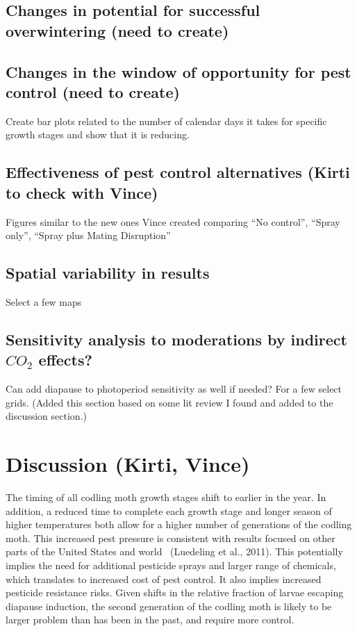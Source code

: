 \documentclass[12pt]{article}
\theoremstyle{plain}
\theoremstyle{definition}
\theoremstyle{definition}
\begin{document}
\subsection{Changes in potential for successful overwintering  (need to create)}

\subsection{Changes in the window of opportunity for pest control  (need to create)}
Create bar plots related to the  number of calendar days it takes for specific growth stages and show that it is reducing.


\subsection{Effectiveness of pest control alternatives  (Kirti to check with Vince)}
Figures similar to the new ones Vince created comparing “No control”, “Spray only”, “Spray plus Mating Disruption”


\subsection{Spatial variability in results}
Select a few maps


\subsection{Sensitivity analysis to moderations by indirect $CO_2$ effects?}
Can add diapause to photoperiod sensitivity as well if needed?
For a few select grids. (Added this section based on some lit review I found and added to the discussion section.)

\section{Discussion (Kirti, Vince)}

The timing of all codling moth growth stages shift to 
earlier in the year. In addition, a reduced time to complete 
each growth stage and longer season of higher temperatures 
both allow for a higher number of generations of the 
codling moth. This increased pest pressure is consistent 
with results focused on other parts of the United States 
and world~\cite{Juszczak2013, Rafoss_Trond, Stoeckli_2012} (Luedeling et al., 2011). 
This potentially implies the need for additional 
pesticide sprays and larger range of chemicals, 
which translates to increased cost of pest control. 
It also implies increased pesticide resistance risks. 
Given shifts in the relative fraction of larvae escaping 
diapause induction, the second generation of the codling 
moth is likely to be larger problem than has been in 
the past, and require more control.
\end{document}
